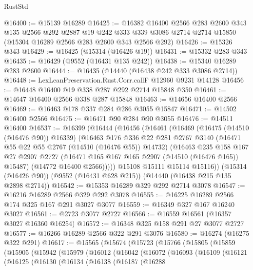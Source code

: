 \begin{lexlean}{RustStd}
\begin{coremodule}
@16400 := @15139 @16289
@16425 := @16382
    @16400
    @2566
    @283
    @2600
    @343
    @135
    @2566
    @292
    @2887
    @19
    @242
    @333
    @339
    @3086
    @2714
    @2714
    @15850
    (@15304 @16289 @2566 @283 @2600 @343 @2566 @292)
@16426 := @15326 @343
@16429 := @16425 (@15314 (@16426 @19))
@16431 := @15332 @283 @343
@16435 := @16429 (@9552 (@16431 @135 @242))
@16438 := @15340 @16289 @283 @2600
@16444 := @16435 (@14440 (@16438 @242 @333 @3086 @2714))
@16448 := LexLeanPreservation.Rust.Corr.callF @12960 @9231 @14128
@16456 := @16448 @16400 @19 @338 @287 @292 @2714 @15848 @350
@16461 := @14647 @16400 @2566 @338 @287 @15848
@16463 := @14656 @16400 @2566
@16469 := @16463 @178 @337 @284 @286 @3055 @15847
@16471 := @14502 @16400 @2566
@16475 := @16471 @90 @284 @90 @3055
@16476 := @14511 @16400
@16537 := @16399
    (@16444
      (@16456
        (@16461
          (@16469
            (@16475 (@14510 (@16476 @90)) @16339)
            (@16463
              @176
              @336
              @22
              @281
              @2767
              @3140
              (@16471 @55 @22 @55 @2767 (@14510 (@16476 @55)) @14732)
              (@16463
                @235
                @158
                @167
                @27
                @2907
                @2727
                (@16471 @165 @167 @165 @2907 (@14510 (@16476 @165)) @15487)
                (@14772 @16400 @2566)))))
        @15108
        @15111
        @15114
        @15116))
    (@15314 (@16426 @90))
    (@9552 (@16431 @628 @215))
    (@14440 (@16438 @215 @135 @2898 @2714))
@16542 := @15353 @16289 @329 @292 @2714 @3078
@16547 := @16216 @16289 @2566 @329 @292 @3078
@16555 := @16225 @16289 @2566 @174 @325 @167 @291 @3027 @3077
@16559 := @16349 @327 @167 @16240 @3027
@16561 := @2723 @3077 @2727
@16566 := @16559 @16561 (@16357 @3027 @16360 @16254)
@16572 := @16348 @325 @158 @291 @27 @3077 @2727
@16577 := @16266 @16289 @2566 @322 @291 @3076
@16580 := @16274 (@16275 @322 @291)
@16617 := @15565
    (@15674
      (@15723
        (@15766
          (@15805
            (@15859
              (@15905
                (@15942
                  (@15979
                    (@16012
                      (@16042
                        (@16072
                          (@16093
                            (@16109
                              (@16121
                                (@16125
                                  (@16130
                                    (@16134
                                      (@16138
                                        (@16187
                                          (@16288

\end{coremodule}
\end{lexlean}
